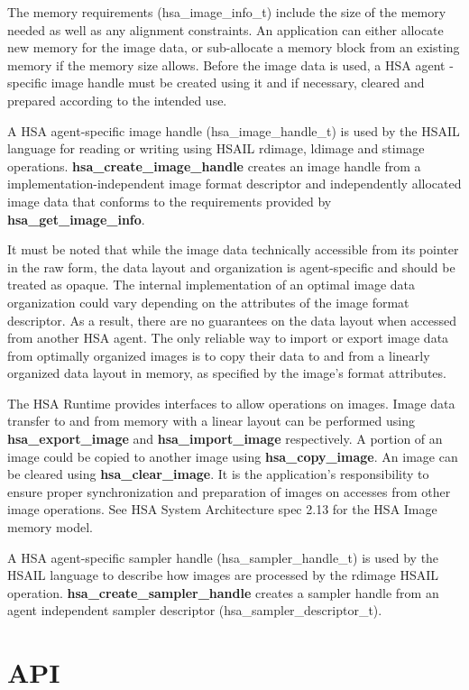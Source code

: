 \documentclass{book}
\newcommand{\reffun}[1]{\textbf{#1}}
\newcommand{\reftyp}[1]{#1}
\begin{document}
\begin{appendices}
The memory requirements (\reftyp{hsa\_image\_info\_t}) include the size
of the memory needed as well as any alignment constraints. An
application can either allocate new memory for the image data, or
sub-allocate a memory block from an existing memory if the memory size
allows. Before the image data is used, a HSA agent -specific image
handle must be created using it and if necessary, cleared and prepared
according to the intended use.

A HSA agent-specific image handle (\reftyp{hsa\_image\_handle\_t}) is
used by the HSAIL language for reading or writing using HSAIL rdimage,
ldimage and stimage operations. \reffun{hsa\_create\_image\_handle}
creates an image handle from a implementation-independent image format
descriptor and independently allocated image data that conforms to the
requirements provided by \reffun{hsa\_get\_image\_info}.

It must be noted that while the image data technically accessible from
its pointer in the raw form, the data layout and organization is
agent-specific and should be treated as opaque. The internal
implementation of an optimal image data organization could vary
depending on the attributes of the image format descriptor. As a
result, there are no guarantees on the data layout when accessed from
another HSA agent. The only reliable way to import or export image
data from optimally organized images is to copy their data to and from
a linearly organized data layout in memory, as specified by the
image’s format attributes.

The HSA Runtime provides interfaces to allow operations on
images. Image data transfer to and from memory with a linear layout
can be performed using \reffun{hsa\_export\_image} and
\reffun{hsa\_import\_image} respectively. A portion of an image could be
copied to another image using \reffun{hsa\_copy\_image}. An image can be
cleared using \reffun{hsa\_clear\_image}. It is the application’s
responsibility to ensure proper synchronization and preparation of
images on accesses from other image operations. See HSA System
Architecture spec 2.13 for the HSA Image memory model.

A HSA agent-specific sampler handle (\reftyp{hsa\_sampler\_handle\_t})
is used by the HSAIL language to describe how images are processed by
the rdimage HSAIL operation. \reffun{hsa\_create\_sampler\_handle}
creates a sampler handle from an agent independent sampler descriptor
(\reftyp{hsa\_sampler\_descriptor\_t}).

\newpage
\hypertarget{Images API}{\section{API} \label{images_api}}
\makeatletter{}


\end{appendices}
\end{document}
